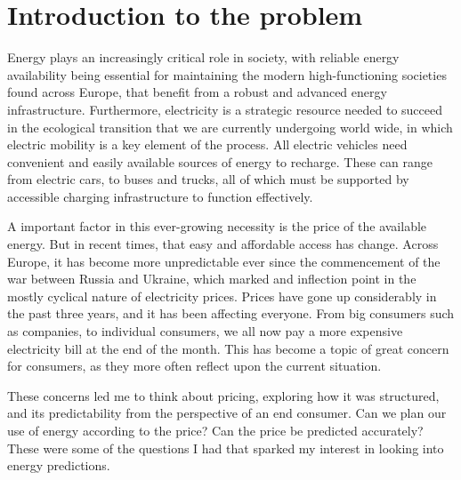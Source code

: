 \documentclass[12pt]{report} %
\begin{document}
\clearpage
{} %





\chapter{Introduction to the problem}

Energy plays an increasingly critical role in society, with reliable energy availability being essential for maintaining the modern high-functioning societies found across Europe, that benefit from a robust and advanced energy infrastructure. Furthermore, electricity is a strategic resource needed to succeed in the ecological transition that we are currently undergoing world wide, in which electric mobility is a key element of the process. All electric vehicles need convenient and easily available sources of energy to recharge. These can range from electric cars, to buses and trucks, all of which must be supported by accessible charging infrastructure to function effectively.

A important factor in this ever-growing necessity is the price of the available energy. But in recent times, that easy and affordable access has change. Across Europe, it has become more unpredictable ever since the commencement of the war between Russia and Ukraine, which marked and inflection point in the mostly cyclical nature of electricity prices. Prices have gone up considerably in the past three years, and it has been affecting everyone. From big consumers such as companies, to individual consumers, we all now pay a more expensive electricity bill at the end of the month. This has become a topic of great concern for consumers, as they more often reflect upon the current situation.

These concerns led me to think about pricing, exploring how it was structured, and its predictability from the perspective of an end consumer. Can we plan our use of energy according to the price? Can the price be predicted accurately? These were some of the questions I had that sparked my interest in looking into energy predictions.
\end{document}
